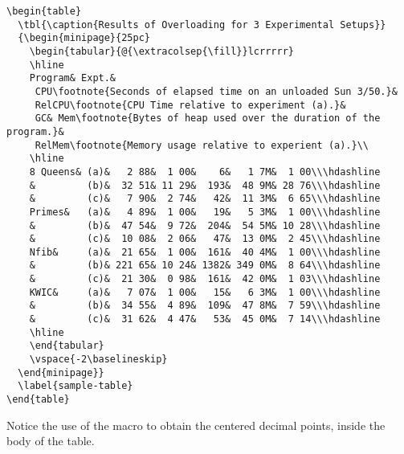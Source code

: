 \documentclass{nle}
\begin{document}
{\fontsize{7}{9}\selectfont
\begin{verbatim}
\begin{table}
  \tbl{\caption{Results of Overloading for 3 Experimental Setups}}
  {\begin{minipage}{25pc}
    \begin{tabular}{@{\extracolsep{\fill}}lcrrrrr}
    \hline
    Program& Expt.&
     CPU\footnote{Seconds of elapsed time on an unloaded Sun 3/50.}&
     RelCPU\footnote{CPU Time relative to experiment (a).}&
     GC& Mem\footnote{Bytes of heap used over the duration of the program.}&
     RelMem\footnote{Memory usage relative to experient (a).}\\
    \hline
    8 Queens& (a)&   2 88&  1 00&    6&   1 7M&  1 00\\\hdashline
    &         (b)&  32 51& 11 29&  193&  48 9M& 28 76\\\hdashline
    &         (c)&   7 90&  2 74&   42&  11 3M&  6 65\\\hdashline
    Primes&   (a)&   4 89&  1 00&   19&   5 3M&  1 00\\\hdashline
    &         (b)&  47 54&  9 72&  204&  54 5M& 10 28\\\hdashline
    &         (c)&  10 08&  2 06&   47&  13 0M&  2 45\\\hdashline
    Nfib&     (a)&  21 65&  1 00&  161&  40 4M&  1 00\\\hdashline
    &         (b)& 221 65& 10 24& 1382& 349 0M&  8 64\\\hdashline
    &         (c)&  21 30&  0 98&  161&  42 0M&  1 03\\\hdashline
    KWIC&     (a)&   7 07&  1 00&   15&   6 3M&  1 00\\\hdashline
    &         (b)&  34 55&  4 89&  109&  47 8M&  7 59\\\hdashline
    &         (c)&  31 62&  4 47&   53&  45 0M&  7 14\\\hdashline
    \hline
    \end{tabular}
    \vspace{-2\baselineskip}
  \end{minipage}}
  \label{sample-table}
\end{table}
\end{verbatim}}
%
\noindent Notice the use of the \verb"" macro to obtain the centered
decimal points, inside the body of the table.
\end{document}
